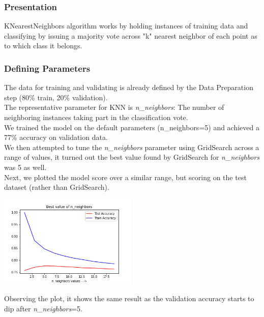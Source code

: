 \subsubsection{Presentation}
KNearestNeighbors algorithm works by holding instances of training data and classifying by issuing a majority vote across "k" nearest neighbor of each point as to which class it belongs.

\subsubsection{Defining Parameters}
The data for training and validating is already defined by the Data Preparation step (80\% train, 20\% validation).\\
The representative parameter for KNN is \emph{n\_neighbors}: The number of neighboring instances taking part in the classification vote.\\
We trained the model on the default parameters (n\_neighbors=5) and achieved a 77\% accuracy on validation data.\\
We then attempted to tune the \emph{n\_neighbors} parameter using GridSearch across a range of values, it turned out the best value found by GridSearch for \emph{n\_neighbors} was 5 as well.\\
Next, we plotted the model score over a similar range, but scoring on the test dataset (rather than GridSearch).
\begin{center}
    \captionsetup{type=figure}
    \includegraphics[width=250px]{knn_complexity.png}
\end{center}
Observing the plot, it shows the same result as the validation accuracy starts to dip after \emph{n\_neighbors}=5.

